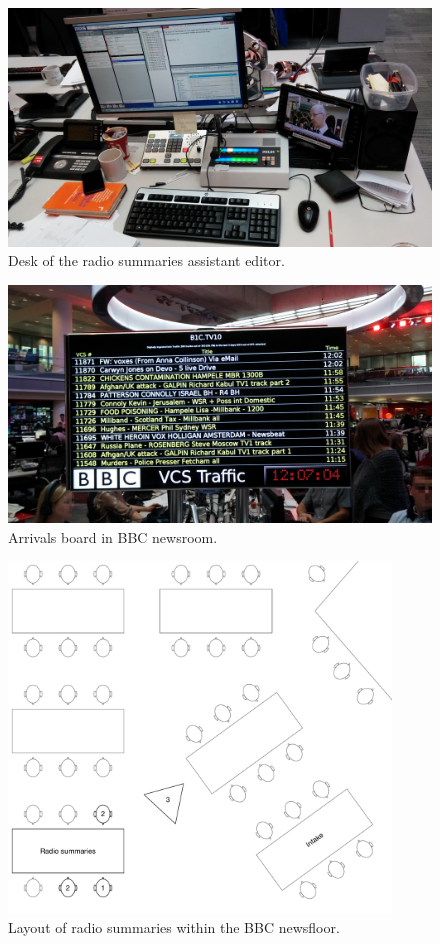 \begin{figure}[p]
  \centering
  \includegraphics[width=\columnwidth]{figs/news-desktop.jpg}
  \caption{Desk of the radio summaries assistant editor.}
  \label{fig:news-desktop}
\end{figure}

\begin{figure}[p]
  \centering
  \includegraphics[width=\columnwidth]{figs/news-intake-pixelated.jpg}
  \caption{Arrivals board in BBC newsroom.}
  \label{fig:news-arrivals}
\end{figure}

\begin{figure}[p]
  \centering
  \includegraphics[width=4in]{figs/news-layout.pdf}
  \caption{Layout of radio summaries within the BBC newsfloor.}
  \label{fig:newsroom-layout}
\end{figure}

